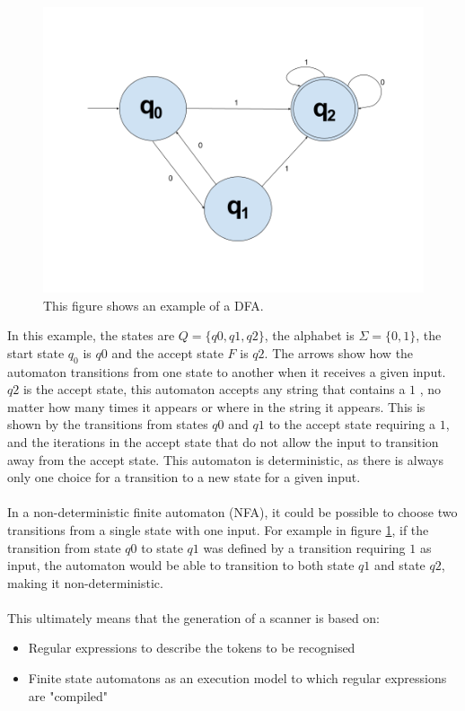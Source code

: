 \begin{figure}[H]
\centering
  \includegraphics[scale=0.35]{figures/DFA.png}
  \caption{This figure shows an example of a DFA.}
  \label{fig:dfaExample}
\end{figure}
\noindent
In this example, the states are $Q = \{q0, q1, q2\}$, the alphabet is $\Sigma = \{0,1\}$, the start state $q_{0}$ is $q0$ and the accept state $F$ is $q2$. 
The arrows show how the automaton transitions from one state to another when it receives a given input. 
$q2$ is the accept state, this automaton accepts any string that contains a $1$ , no matter how many times it appears or where in the string it appears. 
This is shown by the transitions from states $q0$ and $q1$ to the accept state requiring a $1$, and the iterations in the accept state that do not allow the input to transition away from the accept state. 
This automaton is deterministic, as there is always only one choice for a transition to a new state for a given input. 
\\\\
In a non-deterministic finite automaton (NFA), it could be possible to choose two transitions from a single state with one input. 
For example in figure \ref{fig:dfaExample}, if the transition from state $q0$ to state $q1$ was defined by a transition requiring $1$ as input, the automaton would be able to transition to both state $q1$ and state $q2$, making it non-deterministic. 
\\\\
This ultimately means that the generation of a scanner is based on:
\begin{itemize}
    \item Regular expressions to describe the tokens to be recognised
    \item Finite state automatons as an execution model to which regular expressions are "compiled"
\end{itemize}

